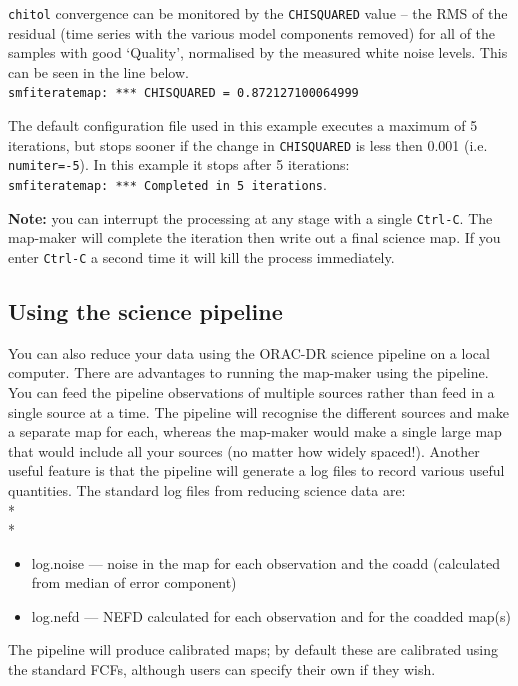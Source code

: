 \documentclass[twoside,11pt]{article}
\newcommand{\xlabel}[1]{}
\renewcommand{\_}{\texttt{\symbol{95}}}
\begin{document}
\texttt{chitol} convergence can be monitored by the
\texttt{CHISQUARED} value -- the RMS of the residual (time series with
the various model components removed) for all of the samples with good
`Quality', normalised by the measured white noise levels. This can be
seen in the line below.\\
\hspace{0.5cm}\texttt{smf\_iteratemap: *** CHISQUARED = 0.872127100064999}


The default configuration file used in this example executes a maximum
of 5 iterations, but stops sooner if the change in \texttt{CHISQUARED}
is less then 0.001 (i.e. \texttt{numiter=-5}). In this example it
stops after 5 iterations: \\
\texttt{smf\_iteratemap: *** Completed in 5 iterations}.


\textbf{Note:} you can interrupt the processing at any stage with a
single \texttt{Ctrl-C}. The map-maker will complete the iteration then write
out a final science map. If you enter \texttt{Ctrl-C} a second time it will
kill the process immediately.

\subsection{\xlabel{sciencepl}Using the science pipeline}

You can also reduce your data using the ORAC-DR science pipeline on a
local computer. There are advantages to running the map-maker using
the pipeline. You can feed the pipeline observations of multiple
sources rather than feed in a single source at a time. The pipeline
will recognise the different sources and make a separate map for each,
whereas the map-maker would make a single large map that would include
all your sources (no matter how widely spaced!). Another useful
feature is that the pipeline will generate a log files to record
various useful quantities. The standard log files from reducing
science data are:\\*\\*
\begin{itemize}
\item log.noise --- noise in the map for each observation and the coadd
(calculated from median of error component)
\item log.nefd --- NEFD calculated for each observation and for the coadded map(s)
\end{itemize}
The pipeline will produce calibrated maps; by default these are
calibrated using the standard FCFs, although users can specify their
own if they wish.
\end{document}
